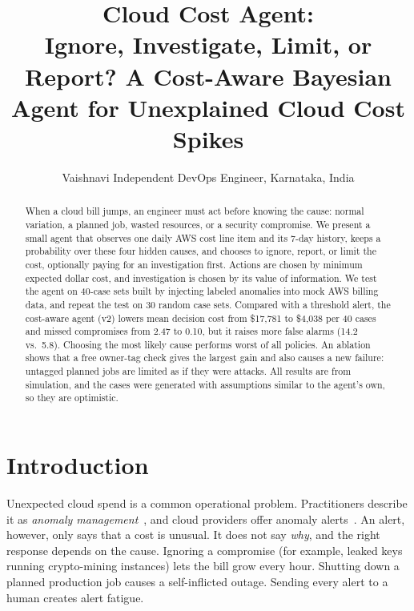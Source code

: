 \documentclass{article}
\title{Cloud Cost Agent:\\Ignore, Investigate, Limit, or Report? A Cost-Aware Bayesian Agent for Unexplained Cloud Cost Spikes}
\author{
Vaishnavi
\affiliations
Independent DevOps Engineer, Karnataka, India
}
\begin{document}
\maketitle
\renewcommand{\thefootnote}{}\renewcommand{\thefootnote}{\arabic{footnote}}

\begin{abstract}
When a cloud bill jumps, an engineer must act before knowing the cause: normal variation, a planned job, wasted resources, or a security compromise. We present a small agent that observes one daily AWS cost line item and its 7-day history, keeps a probability over these four hidden causes, and chooses to ignore, report, or limit the cost, optionally paying for an investigation first. Actions are chosen by minimum expected dollar cost, and investigation is chosen by its value of information. We test the agent on 40-case sets built by injecting labeled anomalies into mock AWS billing data, and repeat the test on 30 random case sets. Compared with a threshold alert, the cost-aware agent (v2) lowers mean decision cost from \$17{,}781 to \$4{,}038 per 40 cases and missed compromises from 2.47 to 0.10, but it raises more false alarms (14.2 vs.\ 5.8). Choosing the most likely cause performs worst of all policies. An ablation shows that a free owner-tag check gives the largest gain and also causes a new failure: untagged planned jobs are limited as if they were attacks. All results are from simulation, and the cases were generated with assumptions similar to the agent's own, so they are optimistic.
\end{abstract}

\section{Introduction}

Unexpected cloud spend is a common operational problem. Practitioners describe it as \emph{anomaly management}~\cite{finops2026framework}, and cloud providers offer anomaly alerts~\cite{aws2026anomaly}. An alert, however, only says that a cost is unusual. It does not say \emph{why}, and the right response depends on the cause. Ignoring a compromise (for example, leaked keys running crypto-mining instances) lets the bill grow every hour. Shutting down a planned production job causes a self-inflicted outage. Sending every alert to a human creates alert fatigue.
\end{document}
